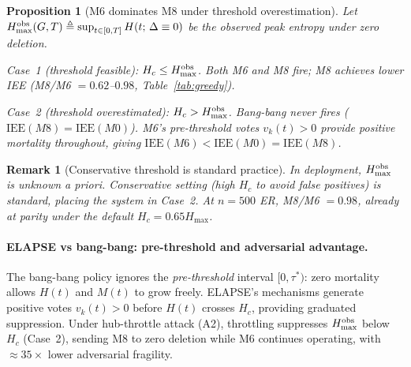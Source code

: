 \documentclass[review,12pt]{elsarticle}
\newcommand{\IEE}{\mathrm{IEE}}
\newcommand{\Hc}{H_c}
\newcommand{\Hmax}{H_{\max}}
\newtheorem{proposition}{Proposition}
\newtheorem{remark}{Remark}
\begin{document}
\begin{proposition}[M6 dominates M8 under threshold overestimation]
\label{prop:hc_dominance}
Let $\Hmax^{\rm obs}(G,T) \triangleq \sup_{t \in [0,T]} H(t;\,\Delta \equiv 0)$
be the observed peak entropy under zero deletion.

\emph{Case~1 (threshold feasible):} $\Hc \leq \Hmax^{\rm obs}$.  Both M6 and M8
fire; M8 achieves lower IEE (M8/M6 $= 0.62$--$0.98$, Table~\ref{tab:greedy}).

\emph{Case~2 (threshold overestimated):} $\Hc > \Hmax^{\rm obs}$.  Bang-bang
never fires ($\IEE(M8) = \IEE(M0)$).  M6's pre-threshold votes $v_k(t)>0$
provide positive mortality throughout, giving $\IEE(M6) < \IEE(M0) = \IEE(M8)$.
\end{proposition}

\begin{remark}[Conservative threshold is standard practice]
In deployment, $\Hmax^{\rm obs}$ is unknown a priori.  Conservative setting
(high $\Hc$ to avoid false positives) is standard, placing the system in
Case~2.  At $n=500$ ER, M8/M6 $= 0.98$, already at parity under the
default $\Hc = 0.65\Hmax$.
\end{remark}

\paragraph{ELAPSE vs bang-bang: pre-threshold and adversarial advantage.}
The bang-bang policy ignores the \emph{pre-threshold} interval $[0, \tau^*)$:
zero mortality allows $H(t)$ and $M(t)$ to grow freely.  ELAPSE's mechanisms
generate positive votes $v_k(t)>0$ before $H(t)$ crosses $\Hc$, providing
graduated suppression.  Under hub-throttle attack (A2), throttling suppresses
$H_{\max}^{\rm obs}$ below $\Hc$ (Case~2), sending M8 to zero deletion
while M6 continues operating, with $\approx 35\times$ lower adversarial fragility.
\end{document}
